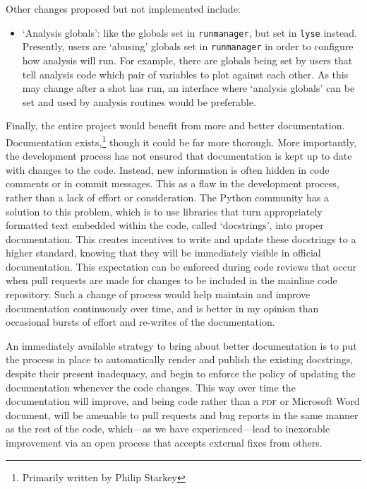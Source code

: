 Other changes proposed but not implemented include:

\begin{itemize}
\item `Analysis globals': like the globals set in \texttt{runmanager}, but set in \texttt{lyse} instead. Presently, users are `abusing' globals set in \texttt{runmanager} in order to configure how analysis will run. For example, there are globals being set by users that tell analysis code which pair of variables to plot against each other. As this may change after a shot has run, an interface where `analysis globals' can be set and used by analysis routines would be preferable.
\end{itemize}

Finally, the entire project would benefit from more and better documentation. Documentation exists,\footnote{Primarily written by Philip Starkey} though it could be far more thorough. More importantly, the development process has not ensured that documentation is kept up to date with changes to the code. Instead, new information is often hidden in code comments or in commit messages. This as a flaw in the development process, rather than a lack of effort or consideration. The Python community has a solution to this problem, which is to use libraries that turn appropriately formatted text embedded within the code, called `docstrings', into proper documentation. This creates incentives to write and update these docstrings to a higher standard, knowing that they will be immediately visible in official documentation. This expectation can be enforced during code reviews that occur when pull requests are made for changes to be included in the mainline code repository. Such a change of process would help maintain and improve documentation continuously over time, and is better in my opinion than occasional bursts of effort and re-writes of the documentation.

An immediately available strategy to bring about better documentation is to put the process in place to automatically render and publish the existing docstrings, despite their present inadequacy, and begin to enforce the policy of updating the documentation whenever the code changes. This way over time the documentation will improve, and being code rather than a \textsc{pdf} or Microsoft Word document, will be amenable to pull requests and bug reports in the same manner as the rest of the code, which---as we have experienced---lead to inexorable improvement via an open process that accepts external fixes from others.

